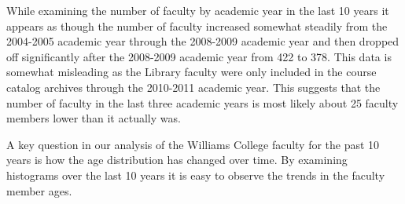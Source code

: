 \documentclass[12pt,a4paper]{article}\usepackage[]{graphicx}\usepackage[]{color}
\theoremstyle{definition}
\begin{document}
\bigskip

While examining the number of faculty by academic year in the last 10 years it appears as though the number of faculty increased somewhat steadily from the 2004-2005 academic year through the 2008-2009 academic year and then dropped off significantly after the 2008-2009 academic year from 422 to 378. This data is somewhat misleading as the Library faculty were only included in the course catalog archives through the 2010-2011 academic year. This suggests that the number of faculty in the last three academic years is most likely about 25 faculty members lower than it actually was. 

\bigskip

A key question in our analysis of the Williams College faculty for the past 10 years is how the age distribution has changed over time. By examining histograms over the last 10 years it is easy to observe the trends in the faculty member ages.
\end{document}
